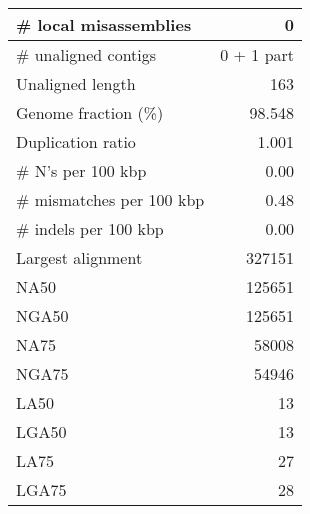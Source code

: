 \documentclass[12pt,a4paper]{article}
\begin{document}
\begin{table}[ht]
\begin{center}
\begin{tabular}{|l*{1}{|r}|}
\# local misassemblies & 0 \\ \hline
\# unaligned contigs & 0 + 1 part \\ \hline
Unaligned length & 163 \\ \hline
Genome fraction (\%) & 98.548 \\ \hline
Duplication ratio & 1.001 \\ \hline
\# N's per 100 kbp & 0.00 \\ \hline
\# mismatches per 100 kbp & 0.48 \\ \hline
\# indels per 100 kbp & 0.00 \\ \hline
Largest alignment & 327151 \\ \hline
NA50 & 125651 \\ \hline
NGA50 & 125651 \\ \hline
NA75 & 58008 \\ \hline
NGA75 & 54946 \\ \hline
LA50 & 13 \\ \hline
LGA50 & 13 \\ \hline
LA75 & 27 \\ \hline
LGA75 & 28 \\ \hline
\end{tabular}
\end{center}
\end{table}
\end{document}
